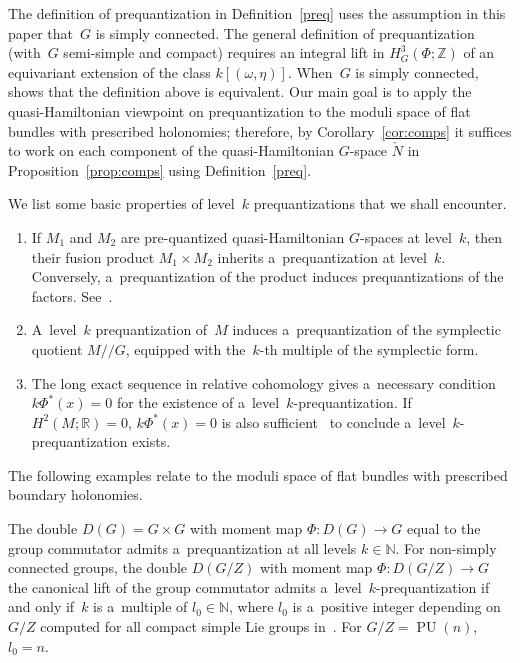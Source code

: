 \documentclass[pdftex]{sigma}
\numberwithin{equation}{section}
\DeclareMathOperator{\PU}{PU}
\begin{document}
\begin{Remark}
The def\/inition of prequantization in Def\/inition~\ref{preq} uses the assumption in this paper that~$G$ is simply
connected.
The general def\/inition of prequantization~\cite[Def\/inition~3.2]{Khomology} (with~$G$ semi-simple and compact) requires
an integral lift in $H^3_G(\Phi;{\mathbb{Z}})$ of an equivariant extension of the class $k[(\omega,\eta)]$.
When~$G$ is simply connected,~\cite[Proposition~3.5]{JGP} shows that the def\/inition above is equivalent.
Our main goal is to apply the quasi-Hamiltonian viewpoint on prequantization to the moduli space of f\/lat bundles with
prescribed holonomies; therefore, by Corollary~\ref{cor:comps} it suf\/f\/ices to work on each component of the
quasi-Hamiltonian $G$-space $\check{N}$ in Proposition~\ref{prop:comps} using Def\/inition~\ref{preq}.
\end{Remark}

We list some basic properties of level~$k$ prequantizations that we shall encounter.
\begin{enumerate}\itemsep=0pt
\item[(a)] If $M_1$ and $M_2$ are pre-quantized quasi-Hamiltonian $G$-spaces at level~$k$, then their fusion product
$M_1 \times M_2$ inherits a~prequantization at level~$k$.
Conversely, a~prequantization of the product induces prequantizations of the factors.
See~\cite[Proposition~3.8]{JGP}.
\item[(b)] A~level~$k$ prequantization of~$M$ induces a~prequantization of the symplectic quotient $M/  / G$, equipped
with the~$k$-th multiple of the symplectic form.
\item[(c)] The long exact sequence in relative cohomology gives a~necessary condition $k\Phi^*(x)=0$ for the existence
of a~level~$k$-prequantization.
If $H^2(M;{\mathbb{R}})=0$, $k\Phi^*(x)=0$ is also suf\/f\/icient~\cite[Proposition~4.2]{JGP} to conclude
a~level~$k$-prequantization exists.
\end{enumerate}

The following examples relate to the moduli space of f\/lat bundles with prescribed boundary holonomies.

\begin{Example}
\label{eg:double}
The double $D(G)=G\times G$ with moment map $\Phi: D(G) \to G$ equal to the group commutator admits a~prequantization at
all levels $k\in {\mathbb{N}}$.
For non-simply connected groups, the double $D(G/Z)$ with moment map $\Phi: D(G/Z) \to G$ the canonical lift of the
group commutator admits a~level~$k$-prequantization if and only if~$k$ is a~multiple of $l_0 \in {\mathbb{N}}$, where
$l_0$ is a~positive integer depending on $G/Z$ computed for all compact simple Lie groups in~\cite{JGP}.
For $G/Z = \PU(n)$, $l_0=n$.
\end{Example}
\end{document}
